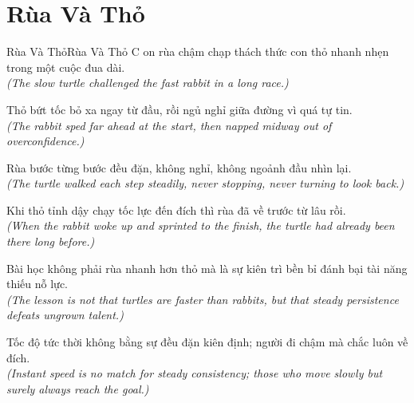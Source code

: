 \section{Rùa Và Thỏ}
\begin{truyen}{Rùa Và Thỏ}{Rùa Và Thỏ}
C on rùa chậm chạp thách thức con thỏ nhanh nhẹn trong một cuộc đua dài.\\
\textit{(The slow turtle challenged the fast rabbit in a long race.)}

Thỏ bứt tốc bỏ xa ngay từ đầu, rồi ngủ nghỉ giữa đường vì quá tự tin.\\
\textit{(The rabbit sped far ahead at the start, then napped midway out of overconfidence.)}

Rùa bước từng bước đều đặn, không nghỉ, không ngoảnh đầu nhìn lại.\\
\textit{(The turtle walked each step steadily, never stopping, never turning to look back.)}

Khi thỏ tỉnh dậy chạy tốc lực đến đích thì rùa đã về trước từ lâu rồi.\\
\textit{(When the rabbit woke up and sprinted to the finish, the turtle had already been there long before.)}

Bài học không phải rùa nhanh hơn thỏ mà là sự kiên trì bền bỉ đánh bại tài năng thiếu nỗ lực.\\
\textit{(The lesson is not that turtles are faster than rabbits, but that steady persistence defeats ungrown talent.)}

\end{truyen}
\begin{baihoc}
  Tốc độ tức thời không bằng sự đều đặn kiên định; người đi chậm mà chắc luôn về đích.\\
  \textit{(Instant speed is no match for steady consistency; those who move slowly but surely always reach the goal.)}
\end{baihoc}


